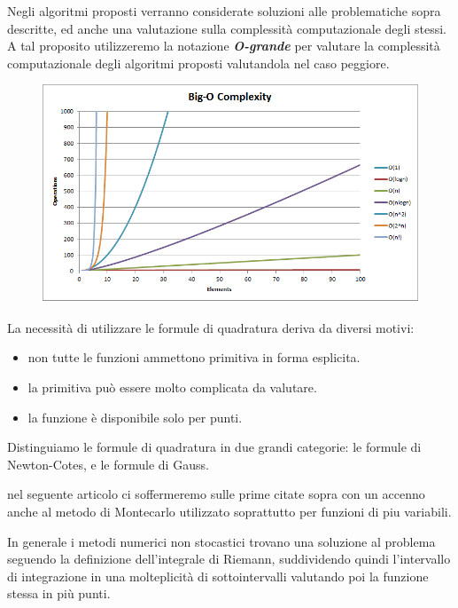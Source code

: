 \documentclass{article}
\begin{document}
Negli algoritmi proposti verranno considerate soluzioni alle problematiche sopra descritte, ed anche una valutazione sulla complessità computazionale degli stessi.
A tal proposito utilizzeremo la notazione \textit{\textbf{O-grande}} per valutare la complessità computazionale degli algoritmi proposti valutandola nel caso peggiore.

\begin{center}
\begin{figure}[ht]

\includegraphics[scale=0.39]{img/big-o-complexity.png} 
\label{fig:complex}
\end{figure}

\end{center}
\newpage
La necessità di utilizzare le formule di quadratura deriva da diversi motivi:
\begin{itemize}
\item non tutte le funzioni ammettono primitiva in forma esplicita.
\item la primitiva può essere molto complicata da valutare.
\item la funzione è disponibile solo per punti.
\end{itemize}
Distinguiamo le formule di quadratura in due grandi categorie: le formule di Newton-Cotes, e le formule di Gauss.

nel seguente articolo ci soffermeremo sulle prime citate sopra con un accenno anche al metodo di Montecarlo utilizzato soprattutto per funzioni di piu variabili.

In generale i metodi numerici non stocastici trovano una soluzione al problema seguendo la definizione dell'integrale di Riemann, suddividendo quindi l'intervallo di integrazione in una molteplicità di sottointervalli valutando poi la funzione stessa in più punti.
\end{document}
